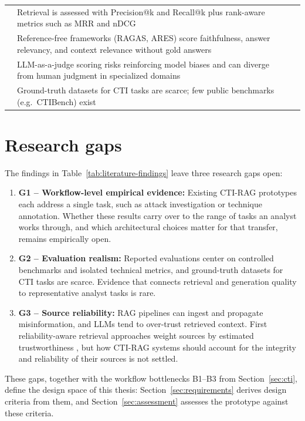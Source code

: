 \begin{longtable}{p{}p{}p{}}
        & Retrieval is assessed with Precision@k and Recall@k plus
          rank-aware metrics such as MRR and nDCG
          & \cite{agnihotram2025retrieval,yu2024evaluation} \\
        & Reference-free frameworks (RAGAS, ARES) score faithfulness,
          answer relevancy, and context relevance without gold answers
          & \cite{es2023ragas,saadfalcon2024ares} \\
        & LLM-as-a-judge scoring risks reinforcing model biases and can
          diverge from human judgment in specialized domains
          & \cite{akkiraju2024facts,yu2024evaluation} \\
        & Ground-truth datasets for CTI tasks are scarce; few public
          benchmarks (e.g.\ CTIBench) exist
          & \cite{xu2025llm,alhuzali2025llm} \\
\end{longtable}
\endgroup

\section{Research gaps}
\label{sec:research-gap}

The findings in Table~\ref{tab:literature-findings} leave three research
gaps open:

\begin{enumerate}
    \item \textbf{G1 -- Workflow-level empirical evidence:} Existing
          CTI-RAG prototypes each address a single task, such as attack
          investigation or technique annotation. Whether these results
          carry over to the range of tasks an analyst works through, and
          which architectural choices matter for that transfer, remains
          empirically open.
    \item \textbf{G2 -- Evaluation realism:} Reported evaluations center
          on controlled benchmarks and isolated technical metrics, and
          ground-truth datasets for CTI tasks are scarce. Evidence that
          connects retrieval and generation quality to representative
          analyst tasks is rare.
    \item \textbf{G3 -- Source reliability:} RAG pipelines can ingest and
          propagate misinformation, and LLMs tend to over-trust retrieved
          context. First reliability-aware retrieval approaches weight
          sources by estimated trustworthiness
          \parencite{hwang2025rarag}, but how CTI-RAG systems should
          account for the integrity and reliability of their sources is
          not settled.
\end{enumerate}

These gaps, together with the workflow bottlenecks B1--B3 from
Section~\ref{sec:cti}, define the design space of this thesis:
Section~\ref{sec:requirements} derives design criteria from them, and
Section~\ref{sec:assessment} assesses the prototype against these
criteria.
